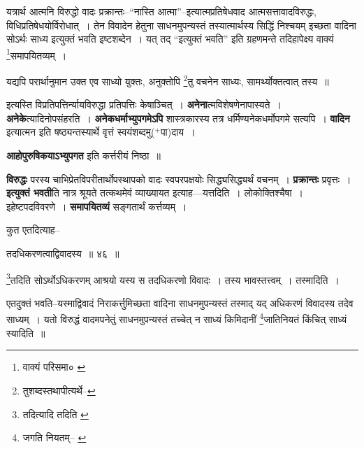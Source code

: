 \documentclass[article,12pt,a4paper]{memoir}
\newcommand{\add}[1]{($^{+}$#1)}
\begin{document}
	  \endgroup
	 

	  \pstart यत्रार्थ आत्मनि विरुद्धो वादः प्रक्रान्तः--“नास्ति आत्मा”--इत्यात्मप्रतिषेधवाद आत्मसत्तावादविरुद्धः, विधिप्रतिषेधयोर्विरोधात् । तेन विवादेन हेतुना साधनमुपन्यस्तं तस्यात्मार्थस्य सिद्धिं निश्चयम् इच्छता वादिना सोऽर्थः साध्य इत्युक्तं भवति इष्टशब्देन । यत् तद् “इत्युक्तं भवति” इति ग्रहणमन्ते तदिहापेक्ष्य वाक्यं \footnote{वाक्यं परिसमा० \cite{dp-msA} \cite{dp-msB} \cite{dp-msC} \cite{dp-msD} \cite{dp-edP} \cite{dp-edH} \cite{dp-edE} \cite{dp-edN}}समापयितव्यम् ।
	\pend
       

	  \pstart यद्यपि परार्थानुमान उक्त एव साध्यो युक्तः, अनुक्तोपि \footnote{तुशब्दस्तथापीत्यर्थे--\cite{dp-msD-n}}तु वचनेन साध्यः, सामर्थ्योक्तत्वात् तस्य ॥
	\pend
      
	  \endgroup
	

	  \pstart इत्यस्ति विप्रतिपत्तिर्न्यायविरुद्धा प्रतिपत्तिः केषाञ्चित् । \textbf{अनेना}त्मविशेषणेनापास्यते । \textbf{अनेके}त्यादिनोपसंहरति । \textbf{अनेकधर्माभ्युपगमेऽपि} शास्त्रकारस्य तत्र धर्मिण्यनेकधर्मोपगमे सत्यपि । \textbf{वादिन} इत्यात्मन इति षष्ठ्यन्तस्यार्थे वृत्तं स्वयंशब्दमु\add{पा}दाय ।
	\pend
      

	  \pstart \textbf{आहोपुरुषिकयाऽभ्युपगत} इति कर्त्तरीयं निष्ठा ॥
	\pend
      

	  \pstart \textbf{विरुद्धः} परस्य चाभिप्रेतविपरीतार्थोपस्थापको वादः स्वपरपक्षयोः सिद्ध्यसिद्ध्यर्थं वचनम् । \textbf{प्रक्रान्तः} प्रवृत्तः । \textbf{इत्युक्तं भवती}ति नात्र श्रूयते तत्कथमेवं व्याख्यायत इत्याह—यत्तदिति । लोकोक्तिश्चैषा । इहेष्टपदविवरणे । \textbf{समापयितव्यं} सङ्गतार्थं कर्त्तव्यम् ।
	\pend
      \leavevmode{}
	  \bigskip
	  \begingroup
	

	  \pstart कुत एतदित्याह--
	\pend
       
	  \bigskip
	  \begingroup
	

	  \pstart तदधिकरणत्वाद्विवादस्य ॥ ४६ ॥
	\pend
      
	  \endgroup
	 

	  \pstart \footnote{तदित्यादि तदिति \cite{dp-msA} \cite{dp-msB} \cite{dp-msC} \cite{dp-msD} \cite{dp-edP} \cite{dp-edH} \cite{dp-edE} \cite{dp-edN}}तदिति सोऽर्थोऽधिकरणम् आश्रयो यस्य स तदधिकरणो विवादः । तस्य भावस्तत्त्वम् । तस्मादिति ।
	\pend
       

	  \pstart एतदुक्तं भवति--यस्माद्विवादं निराकर्त्तुमिच्छता वादिना साधनमुपन्यस्तं तस्माद् यद् अधिकरणं विवादस्य तदेव साध्यम् । यतो विरुद्धं वादमपनेतुं साधनमुपन्यस्तं तच्चेत् न साध्यं किमिदानीं \footnote{जगति नियतम्--\cite{dp-msB} \cite{dp-msC} \cite{dp-msD} \cite{dp-edP} \cite{dp-edH} \cite{dp-edE} \cite{dp-edN}}जातिनियतं किंचित् साध्यं स्यादिति ॥
	\pend
       
\end{document}
